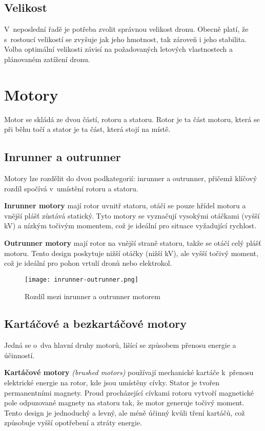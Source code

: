 \documentclass[12pt]{report}
\begin{document}
\subsection[Velikost]{Velikost}
V~neposlední řadě je potřeba zvolit správnou velikost dronu. Obecně platí, že s~rostoucí velikostí se zvyšuje jak jeho hmotnost, tak zároveň i jeho stabilita. Volba optimální velikosti závisí na požadovaných letových vlastnostech a plánovaném zatížení dronu. \cite{mainbook} \cite{dojo} \cite{ultimateguide}

\section[Motory]{Motory}
Motor se skládá ze dvou částí, rotoru a statoru. Rotor je ta část motoru, která se při běhu točí a stator je ta část, která stojí na místě.

\subsection[Inrunner a outrunner]{Inrunner a outrunner}
Motory lze rozdělit do dvou podkategorií: inrunner a outrunner, přičemž klíčový rozdíl spočívá v~umístění rotoru a statoru.

\textbf{Inrunner motory} mají rotor uvnitř statoru, otáčí se pouze hřídel motoru a vnější plášť zůstává statický. Tyto motory se vyznačují vysokými otáčkami (vyšší kV) a nízkým točivým momentem, což je ideální pro situace vyžadující rychlost.

\textbf{Outrunner motory} mají rotor na vnější straně statoru, takže se otáčí celý plášť motoru. Tento design poskytuje nižší otáčky (nižší kV), ale vyšší točivý moment, což je ideální pro pohon vrtulí dronů nebo elektrokol. 

\begin{figure}[H]
	\centering
	\texttt{[image: inrunner-outrunner.png]}
	\caption{Rozdíl mezi inrunner a outrunner motorem \cite{rozum}}
	\label{fig:inrunner-outrunner.png}
  \end{figure}

\subsection[Kartáčové a bezkartáčové motory]{Kartáčové a bezkartáčové motory}
Jedná se o~dva hlavní druhy motorů, lišící se způsobem přenosu energie a účinností.

\textbf{Kartáčové motory} \textit{(brushed motors)} používají mechanické kartáče k~přenosu elektrické energie na rotor, kde jsou umístěny cívky. Stator je tvořen permanentními magnety. Proud procházející cívkami rotoru vytvoří magnetické pole odpuzované magnety na statoru tak, že motor generuje točivý moment. Tento design je jednoduchý a levný, ale méně účinný kvůli tření kartáčů, což způsobuje vyšší opotřebení a ztráty energie.
\end{document}
